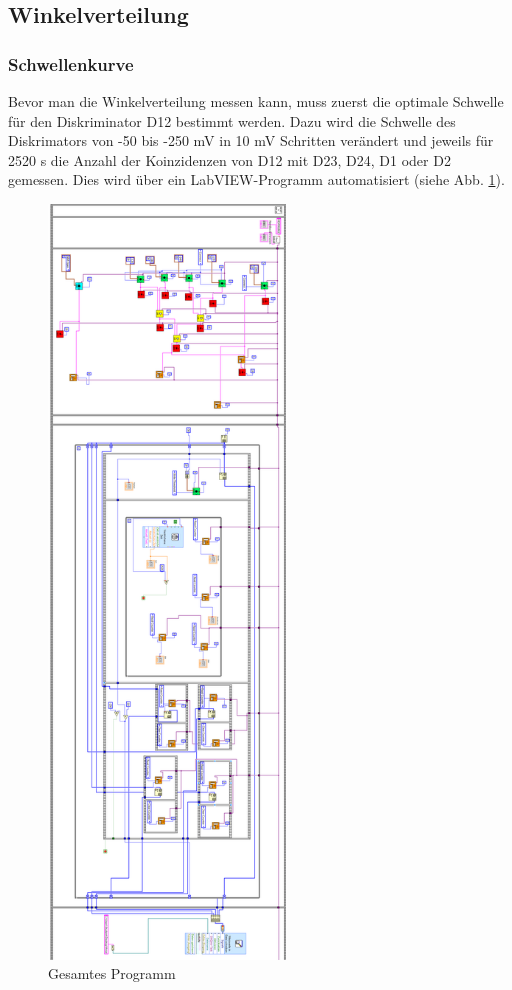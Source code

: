 \subsection{Winkelverteilung}
\subsubsection{Schwellenkurve}
Bevor man die Winkelverteilung messen kann, muss zuerst die optimale Schwelle für den Diskriminator D12 bestimmt werden. Dazu wird die Schwelle des Diskrimators von -50 bis -250 \si{\milli\volt} in 10 \si{\milli\volt} Schritten verändert und jeweils für 2520 \si{\second} die Anzahl der Koinzidenzen von D12 mit D23, D24, D1 oder D2 gemessen. Dies wird über ein LabVIEW-Programm automatisiert (siehe Abb. \ref{fig:prog_all}).\\

\begin{figure}
\centering
\includegraphics[height=20cm]{data/friedrich/prog_ges_rot.png}
\caption{Gesamtes Programm}
\label{fig:prog_all}
\end{figure}

